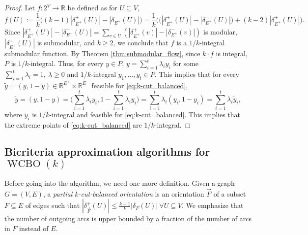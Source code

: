 \documentclass[11pt]{article}
\newcommand{\R}{\mathbb{R}}
\begin{document}
\begin{proof}
Let $f:2^V\rightarrow \R$ be defined as for $U\subseteq V$,
\[f(U):=\frac{1}{k}\Big((k-1)|\delta_{E^+}^+(U)|-|\delta_{E^+}^-(U)|\Big)=\frac{1}{k}\Big(\big(|\delta_{E^+}^+(U)|-|\delta_{E^+}^-(U)|\big)+(k-2)|\delta_{E^+}^+(U)|\Big).
\]
Since $|\delta_{E^+}^+(U)|-|\delta_{E^+}^-(U)|=\sum_{v\in U}(|\delta_{E^+}^+(v)|-|\delta_{E^+}^-(v)|)$ is modular, $|\delta_{E^+}^+(U)|$ is submodular, and $k\geq 2$, we conclude that $f$ is a $1/k$-integral submodular function. By Theorem \ref{thm:submodular_flow}, since $k\cdot f$ is integral, $P$ is $1/k$-integral. Thus, for every $y\in P$, $y=\sum_{i=1}^{t}\lambda_i y_i$ for some $\sum_{i=1}^t\lambda_i=1,\ \lambda\geq 0$ and $1/k$-integral $y_1,...,y_t\in P$. This implies that for every $\tilde{y}=(y,1-y)\in\R^{E^+}\times \R^{E^-}$ feasible for \eqref{eq:k-cut_balanced},
\[\tilde{y}=(y,1-y)=\Big(\sum_{i=1}^{t}\lambda_i y_i,1-\sum_{i=1}^{t}\lambda_i y_i\Big)=\sum_{i=1}^{t}\lambda_i (y_i, 1-y_i)=\sum_{i=1}^{t}\lambda_i\tilde{y}_i,
\]
where $\tilde{y}_i$ is $1/k$-integral and feasible for \eqref{eq:k-cut_balanced}. This implies that the extreme points of \eqref{eq:k-cut_balanced} are $1/k$-integral.
\end{proof}
    



\subsection{Bicriteria approximation algorithms for $\operatorname{WCBO}(k)$}\label{sec:WCBO-approx}
Before going into the algorithm, we need one more definition. Given a graph $G=(V,E)$, a \emph{partial $k$-cut-balanced orientation} is an orientation $\vec{F}$ of a subset $F\subseteq E$ of edges such that $|\delta_{\vec{F}}^+(U)|\leq \frac{k-1}{k}|\delta_{F}(U)|\ \forall U\subseteq V$. We emphasize that the number of outgoing arcs is upper bounded by a fraction of the number of arcs in $F$ instead of $E$.
\end{document}
